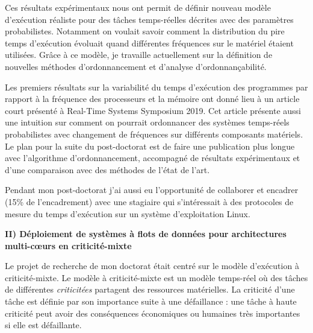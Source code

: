 \documentclass{article}
\begin{document}
Ces résultats expérimentaux nous ont permit de définir nouveau modèle d'exécution réaliste pour des tâches 
temps-réelles décrites avec des paramètres probabilistes. Notamment on voulait savoir comment la 
distribution du pire temps d'exécution évoluait quand différentes fréquences sur le matériel étaient utilisées. 
Grâce à ce modèle, je travaille actuellement sur la définition de nouvelles méthodes d'ordonnancement et 
d'analyse d'ordonnançabilité.




\vspace{.5cm}
Les premiers résultats sur la variabilité du temps d'exécution  des programmes par rapport à la fréquence 
des processeurs et la mémoire ont donné lieu à un article court présenté à Real-Time Systems Symposium 
2019. Cet article présente aussi une intuition sur comment on pourrait ordonnancer des systèmes 
temps-réels probabilistes avec changement de fréquences sur différents composants matériels. Le plan 
pour la suite du post-doctorat est de faire une publication plus longue avec l'algorithme d'ordonnancement, 
accompagné de résultats expérimentaux et d'une comparaison avec des méthodes de l'état de l'art.

\vspace{.5cm}
Pendant mon post-doctorat j'ai aussi eu l'opportunité de collaborer et encadrer (15\% de l'encadrement) 
avec une stagiaire qui s'intéressait à des protocoles de mesure du temps d'exécution sur un système 
d'exploitation Linux.

\vspace{.5cm}
\textbf{II) Déploiement de systèmes à flots de données pour architectures multi-c\oe{}urs en criticité-mixte}
\vspace{.5cm}

Le projet de recherche de mon doctorat était centré sur le modèle d'exécution à criticité-mixte. Le modèle à 
criticité-mixte est un modèle temps-réel où des tâches de différentes \textit{criticitées} partagent des 
ressources matérielles. La criticité d'une tâche est définie par son importance suite à une défaillance : une 
tâche à haute criticité peut avoir des conséquences économiques ou humaines très importantes si elle est 
défaillante.
\end{document}
